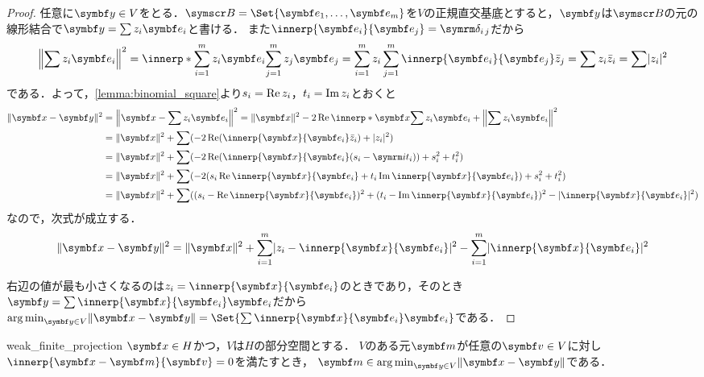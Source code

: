 \documentclass[../../main]{subfiles}
\begin{document}
\begin{proof}
  任意に\(\vect{y}\in V\)をとる．\(\basis{B}=\Set{\vect{e}_1,\dots,\vect{e}_m}\)を\(V\)の正規直交基底とすると，\(\vect{y}\)は\(\basis{B}\)の元の線形結合で\(\vect{y}=\sum z_i\vect{e}_i\)と書ける．
  また\(\innerp{\vect{e}_i}{\vect{e}_j}=\kdelta{i}{j}\)だから
  \[
    \vnorm*{\sum z_i\vect{e}_i}^2 = \innerp*{\sum_{i=1}^mz_i\vect{e}_i}{\sum_{j=1}^mz_j\vect{e}_j}
    = \sum_{i=1}^mz_i\sum_{j=1}^m\innerp{\vect{e}_i}{\vect{e}_j}\conj{z}_j
    = \sum z_i\conj{z}_i
    = \sum\abs{z_i}^2
  \]
  である．よって，\cref{lemma:binomial_square}より\(s_i=\operatorname{Re} z_i\)，\(t_i=\operatorname{Im} z_i\)とおくと
  \begin{align*}
    \vnorm{\vect{x}-\vect{y}}^2 &= \vnorm*{\vect{x}-\sum z_i\vect{e}_i}^2
    = \vnorm{\vect{x}}^2-2\rpart\innerp*{\vect{x}}{\sum z_i\vect{e}_i}+\vnorm*{\sum z_i\vect{e}_i}^2 \\
    &= \vnorm{\vect{x}}^2+\sum(-2\rpart(\innerp{\vect{x}}{\vect{e}_i}\conj{z}_i)+\abs{z_i}^2) \\
    &= \vnorm{\vect{x}}^2+\sum(-2\rpart(\innerp{\vect{x}}{\vect{e}_i}(s_i-\iuni t_i))+s_i^2+t_i^2) \\
    &= \vnorm{\vect{x}}^2+\sum(-2(s_i\rpart\innerp{\vect{x}}{\vect{e}_i}+t_i\ipart\innerp{\vect{x}}{\vect{e}_i})+s_i^2+t_i^2) \\
    &= \vnorm{\vect{x}}^2+\sum((s_i-\rpart\innerp{\vect{x}}{\vect{e}_i})^2+(t_i-\ipart\innerp{\vect{x}}{\vect{e}_i})^2-\abs{\innerp{\vect{x}}{\vect{e}_i}}^2)
  \end{align*}
  なので，次式が成立する．
  \begin{equation}
    \label{equation:pre_bessels_inequality}
    \vnorm{\vect{x}-\vect{y}}^2 = \vnorm{\vect{x}}^2+\sum_{i=1}^m\abs{z_i-\innerp{\vect{x}}{\vect{e}_i}}^2-\sum_{i=1}^m\abs{\innerp{\vect{x}}{\vect{e}_i}}^2
  \end{equation}

  右辺の値が最も小さくなるのは\(z_i=\innerp{\vect{x}}{\vect{e}_i}\)のときであり，そのとき\(\vect{y}=\sum\innerp{\vect{x}}{\vect{e}_i}\vect{e}_i\)だから
  \(\argmin_{\vect{y}\in V}\vnorm{\vect{x}-\vect{y}}=\Set{\sum\innerp{\vect{x}}{\vect{e}_i}\vect{e}_i}\)である．
\end{proof}

\begin{proposition}{}{weak_finite_projection}
  \(\vect{x}\in H\)かつ，\(V\)は\(H\)の部分空間とする．
  \(V\)のある元\(\vect{m}\)が任意の\(\vect{v}\in V\)に対し\(\innerp{\vect{x}-\vect{m}}{\vect{v}}=0\)を満たすとき，
  \(\vect{m}\in\argmin_{\vect{y}\in V}\vnorm{\vect{x}-\vect{y}}\)である．
\end{proposition}
\end{document}
